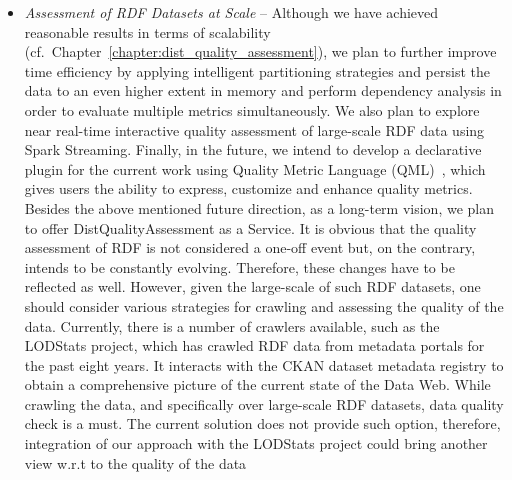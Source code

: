 \begin{itemize}
    \item \textit{Assessment of \gls{RDF} Datasets at Scale} -- 
    Although we have achieved reasonable results in terms of scalability (cf.\ Chapter~\ref{chapter:dist_quality_assessment}), we plan to further improve time efficiency by applying intelligent partitioning strategies and persist the data to an even higher extent in memory and perform dependency analysis in order to evaluate multiple metrics simultaneously. 
    We also plan to explore near real-time interactive quality assessment of large-scale \gls{RDF} data using Spark Streaming.
    Finally, in the future, we intend to develop a declarative plugin for the current work using Quality Metric Language (QML)~\cite{debattista2016luzzu}, which gives users the ability to express, customize and enhance quality metrics.
    Besides the above mentioned future direction, as a long-term vision, we plan to offer DistQualityAssessment as a Service.
    It is obvious that the quality assessment of \gls{RDF} is not considered a one-off event but, on the contrary, intends to be constantly evolving.
    Therefore, these changes have to be reflected as well.
    However, given the large-scale of such \gls{RDF} datasets, one should consider various strategies for crawling and assessing the quality of the data.
    Currently, there is a number of crawlers available, such as the LODStats project, which has crawled \gls{RDF} data from metadata portals for the past eight years. 
    It interacts with the CKAN dataset metadata registry to obtain a comprehensive picture of the current state of the Data Web.
    While crawling the data, and specifically over large-scale \gls{RDF} datasets, data quality check is a must.
    The current solution does not provide such option, therefore, integration of our approach with the LODStats project could bring another view w.r.t to the quality of the data
    

\end{itemize}

